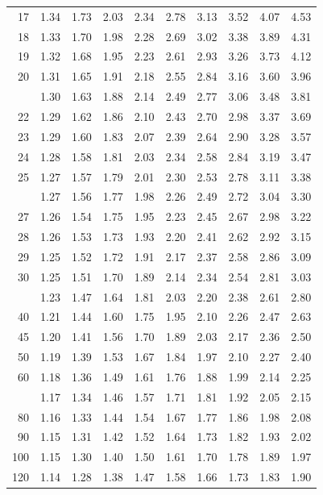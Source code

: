 \documentclass[10pt]{article}
\begin{document}
\begin{longtable}{@{}r!{\vrule width 0.8pt\hspace{0.55em}}rrrrrrrrr@{}}
17 & 1.34 & 1.73 & 2.03 & 2.34 & 2.78 & 3.13 & 3.52 & 4.07 & 4.53 \\
18 & 1.33 & 1.70 & 1.98 & 2.28 & 2.69 & 3.02 & 3.38 & 3.89 & 4.31 \\
19 & 1.32 & 1.68 & 1.95 & 2.23 & 2.61 & 2.93 & 3.26 & 3.73 & 4.12 \\
20 & 1.31 & 1.65 & 1.91 & 2.18 & 2.55 & 2.84 & 3.16 & 3.60 & 3.96 \\
 & 1.30 & 1.63 & 1.88 & 2.14 & 2.49 & 2.77 & 3.06 & 3.48 & 3.81 \\
22 & 1.29 & 1.62 & 1.86 & 2.10 & 2.43 & 2.70 & 2.98 & 3.37 & 3.69 \\
23 & 1.29 & 1.60 & 1.83 & 2.07 & 2.39 & 2.64 & 2.90 & 3.28 & 3.57 \\
24 & 1.28 & 1.58 & 1.81 & 2.03 & 2.34 & 2.58 & 2.84 & 3.19 & 3.47 \\
25 & 1.27 & 1.57 & 1.79 & 2.01 & 2.30 & 2.53 & 2.78 & 3.11 & 3.38 \\
 & 1.27 & 1.56 & 1.77 & 1.98 & 2.26 & 2.49 & 2.72 & 3.04 & 3.30 \\
27 & 1.26 & 1.54 & 1.75 & 1.95 & 2.23 & 2.45 & 2.67 & 2.98 & 3.22 \\
28 & 1.26 & 1.53 & 1.73 & 1.93 & 2.20 & 2.41 & 2.62 & 2.92 & 3.15 \\
29 & 1.25 & 1.52 & 1.72 & 1.91 & 2.17 & 2.37 & 2.58 & 2.86 & 3.09 \\
30 & 1.25 & 1.51 & 1.70 & 1.89 & 2.14 & 2.34 & 2.54 & 2.81 & 3.03 \\
 & 1.23 & 1.47 & 1.64 & 1.81 & 2.03 & 2.20 & 2.38 & 2.61 & 2.80 \\
40 & 1.21 & 1.44 & 1.60 & 1.75 & 1.95 & 2.10 & 2.26 & 2.47 & 2.63 \\
45 & 1.20 & 1.41 & 1.56 & 1.70 & 1.89 & 2.03 & 2.17 & 2.36 & 2.50 \\
50 & 1.19 & 1.39 & 1.53 & 1.67 & 1.84 & 1.97 & 2.10 & 2.27 & 2.40 \\
60 & 1.18 & 1.36 & 1.49 & 1.61 & 1.76 & 1.88 & 1.99 & 2.14 & 2.25 \\
 & 1.17 & 1.34 & 1.46 & 1.57 & 1.71 & 1.81 & 1.92 & 2.05 & 2.15 \\
80 & 1.16 & 1.33 & 1.44 & 1.54 & 1.67 & 1.77 & 1.86 & 1.98 & 2.08 \\
90 & 1.15 & 1.31 & 1.42 & 1.52 & 1.64 & 1.73 & 1.82 & 1.93 & 2.02 \\
100 & 1.15 & 1.30 & 1.40 & 1.50 & 1.61 & 1.70 & 1.78 & 1.89 & 1.97 \\
120 & 1.14 & 1.28 & 1.38 & 1.47 & 1.58 & 1.66 & 1.73 & 1.83 & 1.90 \\

\end{longtable}
\end{document}

